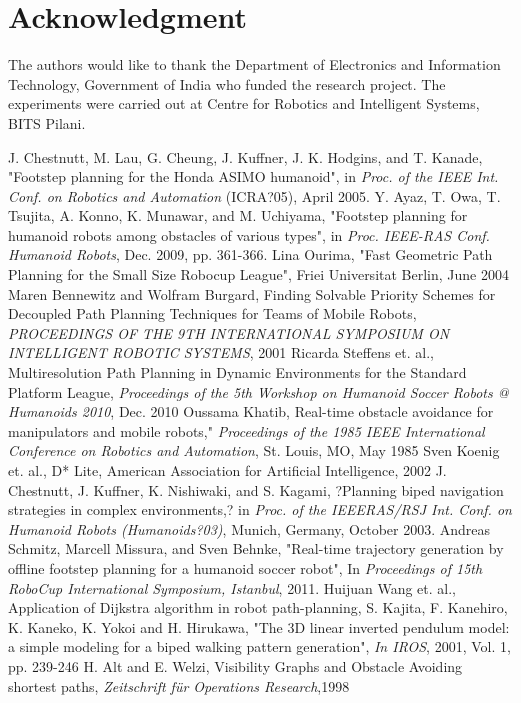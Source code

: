 \documentclass[letterpaper, 10 pt, conference]{ieeeconf}  %
\begin{document}
\section{Acknowledgment}


The authors would like to thank the Department of Electronics and Information Technology, Government of India who funded the research project. The experiments were carried out at Centre for Robotics and Intelligent Systems, BITS Pilani.

\addtolength{\textheight}{-12cm}  

\begin{thebibliography}{99}
J. Chestnutt, M. Lau, G. Cheung, J. Kuffner, J. K. Hodgins, and
T. Kanade, "Footstep planning for the Honda ASIMO humanoid", in
\emph{Proc. of the IEEE Int. Conf. on Robotics and Automation} (ICRA?05),
April 2005.
 Y. Ayaz, T. Owa, T. Tsujita, A. Konno, K. Munawar, and M. Uchiyama,
"Footstep planning for humanoid robots among obstacles of various
types", in \emph{Proc. IEEE-RAS Conf. Humanoid Robots}, Dec. 2009, pp. 361-366.
 Lina Ourima, "Fast Geometric Path Planning for the Small Size Robocup League", Friei Universitat Berlin, June 2004
 Maren Bennewitz and Wolfram Burgard, Finding Solvable Priority Schemes for Decoupled Path Planning Techniques for Teams of Mobile Robots, \emph{PROCEEDINGS OF THE 9TH INTERNATIONAL SYMPOSIUM ON INTELLIGENT ROBOTIC SYSTEMS}, 2001
 Ricarda Steffens et. al., Multiresolution Path Planning in Dynamic Environments for the Standard Platform League, \emph{Proceedings of the 5th Workshop on Humanoid Soccer Robots @ Humanoids 2010}, Dec. 2010
 Oussama Khatib, Real-time obstacle avoidance
for manipulators and mobile robots," \emph{Proceedings
of the 1985 IEEE International Conference
on Robotics and Automation}, St. Louis, MO, May
1985
 Sven Koenig et. al., D* Lite, American Association for Artificial Intelligence, 2002
 J. Chestnutt, J. Kuffner, K. Nishiwaki, and S. Kagami, ?Planning biped
navigation strategies in complex environments,? in \emph{Proc. of the IEEERAS/RSJ
Int. Conf. on Humanoid Robots (Humanoids?03)}, Munich,
Germany, October 2003.
 Andreas Schmitz, Marcell Missura, and Sven Behnke, "Real-time trajectory generation
by offline footstep planning for a humanoid soccer robot",  In \emph{Proceedings of
15th RoboCup International Symposium, Istanbul}, 2011.
 Huijuan Wang  et. al., Application of Dijkstra algorithm in robot
path-planning, 
 S. Kajita, F. Kanehiro, K. Kaneko, K. Yokoi and H. Hirukawa, "The 3D linear inverted
pendulum model: a simple modeling for a biped walking pattern generation", \emph{In
IROS}, 2001, Vol. 1, pp. 239-246
 H. Alt and E. Welzi, Visibility Graphs and Obstacle Avoiding shortest paths, \emph{Zeitschrift für Operations Research},1998


\end{thebibliography}
\end{document}

